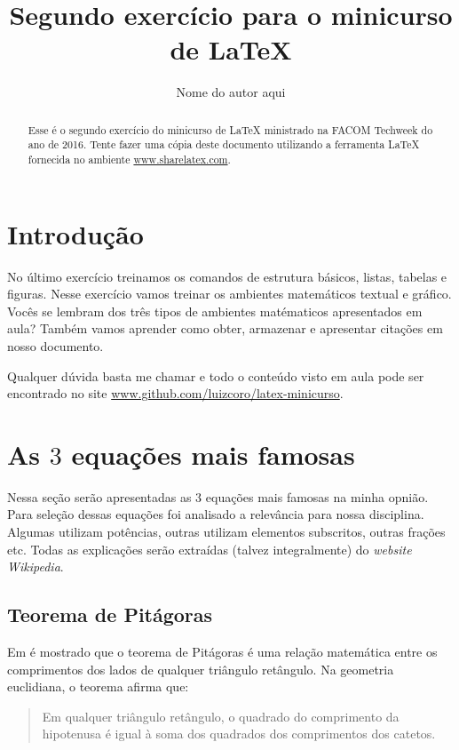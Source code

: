 \documentclass[12pt]{article}
\author{Nome do autor aqui}
\title{Segundo exercício para o minicurso de \LaTeX{}}
\date{}
\begin{document}
\maketitle

\begin{abstract}
Esse é o segundo exercício do minicurso de \LaTeX{} ministrado na FACOM Techweek do ano de 2016. Tente fazer uma cópia deste documento utilizando a ferramenta \LaTeX{} fornecida no ambiente \url{www.sharelatex.com}.
\end{abstract}


\section{Introdução}
\label{sec:introducao}

No último exercício treinamos os comandos de estrutura básicos, listas, tabelas e figuras. Nesse exercício vamos treinar os ambientes matemáticos textual e gráfico. Vocês se lembram dos três tipos de ambientes matématicos apresentados em aula? Também vamos aprender como obter, armazenar e apresentar citações em nosso documento.

Qualquer dúvida basta me chamar e todo o conteúdo visto em aula pode ser encontrado no site \url{www.github.com/luizcoro/latex-minicurso}.

\section{As $3$ equações mais famosas}
\label{sec:sec2}

Nessa seção serão apresentadas as $3$ equações mais famosas na minha opnião. Para seleção dessas equações foi analisado a relevância para nossa disciplina. Algumas utilizam potências, outras utilizam elementos subscritos, outras frações etc. Todas as explicações serão extraídas (talvez integralmente) do \textit{website} \textit{Wikipedia}.

\subsection{Teorema de Pitágoras}

Em \cite{pitagoras} é mostrado que o teorema de Pitágoras é uma relação matemática entre os comprimentos dos lados de qualquer triângulo retângulo. Na geometria euclidiana, o teorema afirma que:

\begin{quote}
Em qualquer triângulo retângulo, o quadrado do comprimento da hipotenusa é igual à soma dos quadrados dos comprimentos dos catetos.
\end{quote}
\end{document}
